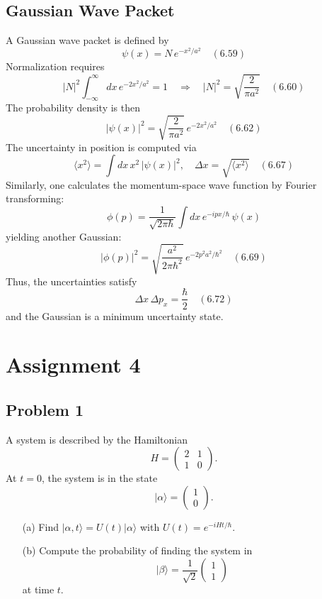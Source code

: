 \documentclass[twocolumn]{article}
\begin{document}
\begin{spacing}{1}
\subsection{Gaussian Wave Packet}
A Gaussian wave packet is defined by
\[
\psi(x)= N\, e^{-x^2/a^2} \quad (6.59)
\]
Normalization requires
\[
|N|^2\int_{-\infty}^{\infty} dx\, e^{-2x^2/a^2} =1 \quad \Rightarrow\quad |N|^2 = \sqrt{\frac{2}{\pi a^2}} \quad (6.60)
\]
The probability density is then
\[
|\psi(x)|^2 = \sqrt{\frac{2}{\pi a^2}}\, e^{-2x^2/a^2} \quad (6.62)
\]
The uncertainty in position is computed via
\[
\langle x^2\rangle = \int dx\, x^2\, |\psi(x)|^2,\quad \Delta x = \sqrt{\langle x^2\rangle} \quad (6.67)
\]
Similarly, one calculates the momentum-space wave function by Fourier transforming:
\[
\phi(p)= \frac{1}{\sqrt{2\pi\hbar}} \int dx\, e^{-ipx/\hbar}\, \psi(x)
\]
yielding another Gaussian:
\[
|\phi(p)|^2 = \sqrt{\frac{a^2}{2\pi\hbar^2}}\, e^{-2p^2a^2/\hbar^2} \quad (6.69)
\]
Thus, the uncertainties satisfy
\[
\Delta x\, \Delta p_x = \frac{\hbar}{2} \quad (6.72)
\]
and the Gaussian is a minimum uncertainty state.

\section{Assignment 4}

\subsection{Problem 1}
A system is described by the Hamiltonian
\[
H = \begin{pmatrix}
2 & 1 \\
1 & 0
\end{pmatrix}.
\]
At $t=0$, the system is in the state
\[
|\alpha\rangle = \begin{pmatrix} 1 \\ 0 \end{pmatrix}.
\]
\begin{enumerate}
\item[(a)] Find $|\alpha,t\rangle = U(t)|\alpha\rangle$ with $U(t) = e^{-iHt/\hbar}$.
\item[(b)] Compute the probability of finding the system in
\[
|\beta\rangle = \frac{1}{\sqrt{2}}\begin{pmatrix}1 \\ 1\end{pmatrix}
\]
at time $t$.
\end{enumerate}


\end{spacing}
\end{document}
